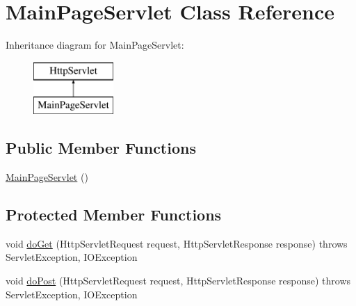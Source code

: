 \hypertarget{class_main_page_servlet}{}\section{Main\+Page\+Servlet Class Reference}
\label{class_main_page_servlet}
Inheritance diagram for Main\+Page\+Servlet\+:\begin{figure}[H]
\begin{center}
\leavevmode
\includegraphics[height=2.000000cm]{class_main_page_servlet}
\end{center}
\end{figure}
\subsection*{Public Member Functions}
\begin{DoxyCompactItemize}
\item 
\hyperlink{class_main_page_servlet_a0b23130b80534dc206b4a288b1e53020}{Main\+Page\+Servlet} ()
\end{DoxyCompactItemize}
\subsection*{Protected Member Functions}
\begin{DoxyCompactItemize}
\item 
void \hyperlink{class_main_page_servlet_aa6d8401b0765748b6b8d02e3b83927b2}{do\+Get} (Http\+Servlet\+Request request, Http\+Servlet\+Response response)  throws Servlet\+Exception, I\+O\+Exception 
\item 
void \hyperlink{class_main_page_servlet_ac9c39a575df8e9a72cd77fa1e6f04479}{do\+Post} (Http\+Servlet\+Request request, Http\+Servlet\+Response response)  throws Servlet\+Exception, I\+O\+Exception 
\end{DoxyCompactItemize}
